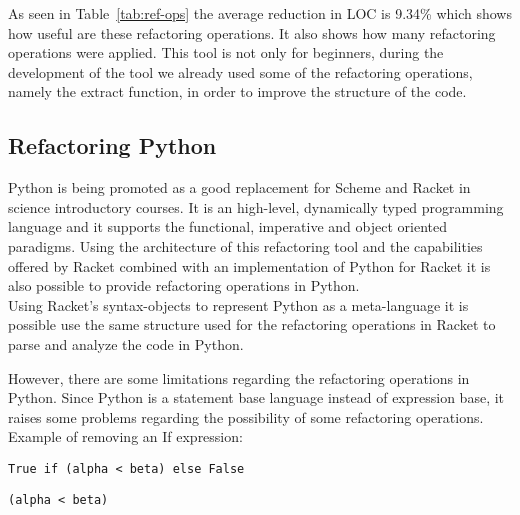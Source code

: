 As seen in Table~\ref{tab:ref-ops} the average reduction in LOC is 9.34\% which
shows how useful are these refactoring operations. It also shows how many
refactoring operations were applied.
This tool is not only for beginners, during the development of the tool we already
used some of the refactoring operations, namely the extract function, in order to
improve the structure of the code.


\subsection{Refactoring Python}
Python is being promoted as a good replacement for Scheme and Racket in science introductory courses.
It is an high-level, dynamically typed programming language and it supports the functional, imperative and object
oriented paradigms.
Using the architecture of this refactoring tool and the capabilities offered by Racket combined
with an implementation of Python for Racket\cite{ramos2014implementation} \cite{ramos2014reaching}
it is also possible to provide refactoring operations in Python. \\
Using Racket's syntax-objects to represent Python as a meta-language \cite{tichelaar2000meta}
it is possible use the same structure used for the refactoring operations in Racket to parse and analyze the code in Python.

However, there are some limitations regarding the refactoring operations in Python.
Since Python is a statement base language instead of expression base, it raises
some problems regarding the possibility of some refactoring operations. \\

Example of removing an If expression:
\lstset{style=python}
\begin{lstlisting}
True if (alpha < beta) else False
\end{lstlisting}


\begin{lstlisting}
(alpha < beta)
\end{lstlisting}

